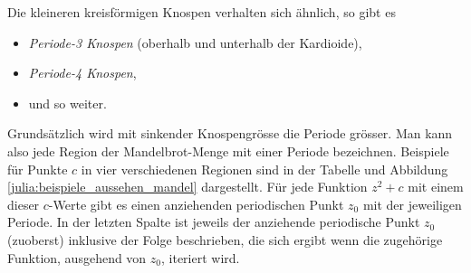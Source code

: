 Die kleineren kreisförmigen Knospen verhalten sich ähnlich, so gibt es
\begin{itemize}
    \item \emph{Periode-3 Knospen} (oberhalb und unterhalb der Kardioide),
%
%
    \item \emph{Periode-4 Knospen},
%
%
    \item und so weiter.
\end{itemize}
Grundsätzlich wird mit sinkender Knospengrösse die Periode grösser.
Man kann also jede Region der Mandelbrot-Menge mit einer Periode bezeichnen.
Beispiele für Punkte $c$ in vier verschiedenen Regionen sind in der Tabelle und Abbildung \ref{julia:beispiele_aussehen_mandel} dargestellt.
Für jede Funktion $z^2 + c$ mit einem dieser $c$-Werte gibt es einen anziehenden periodischen Punkt $z_0$ mit der jeweiligen Periode.
In der letzten Spalte ist jeweils der anziehende periodische Punkt $z_0$ (zuoberst) inklusive der Folge beschrieben, die sich ergibt wenn die zugehörige Funktion, ausgehend von $z_0$, iteriert wird.

